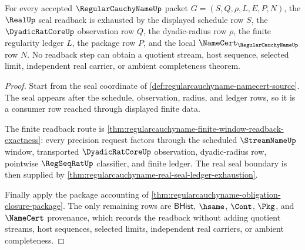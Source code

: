\begin{theorem}
\label{thm:regularcauchyname-seal-readback-exhaustion}
For every accepted $\RegularCauchyNameUp$ packet $G=(S,Q,\rho,L,E,P,N)$, the $\RealUp$ seal readback is exhausted by the displayed schedule row $S$, the $\DyadicRatCoreUp$ observation row $Q$, the dyadic-radius row $\rho$, the finite regularity ledger $L$, the package row $P$, and the local $\NameCert_{\RegularCauchyNameUp}$ row $N$. No readback step can obtain a quotient stream, host sequence, selected limit, independent real carrier, or ambient completeness theorem.
\end{theorem}
\begin{proof}
Start from the seal coordinate of \autoref{def:regularcauchyname-namecert-source}. The seal appears after the schedule, observation, radius, and ledger rows, so it is a consumer row reached through displayed finite data.

The finite readback route is \autoref{thm:regularcauchyname-finite-window-readback-exactness}: every precision request factors through the scheduled $\StreamNameUp$ window, transported $\DyadicRatCoreUp$ observation, dyadic-radius row, pointwise $\RegSeqRatUp$ classifier, and finite ledger. The real seal boundary is then supplied by \autoref{thm:regularcauchyname-real-seal-ledger-exhaustion}.

Finally apply the package accounting of \autoref{thm:regularcauchyname-obligation-closure-package}. The only remaining rows are $\mathsf{BHist}$, $\hsame$, $\Cont$, $\Pkg$, and $\NameCert$ provenance, which records the readback without adding quotient streams, host sequences, selected limits, independent real carriers, or ambient completeness.
\end{proof}

